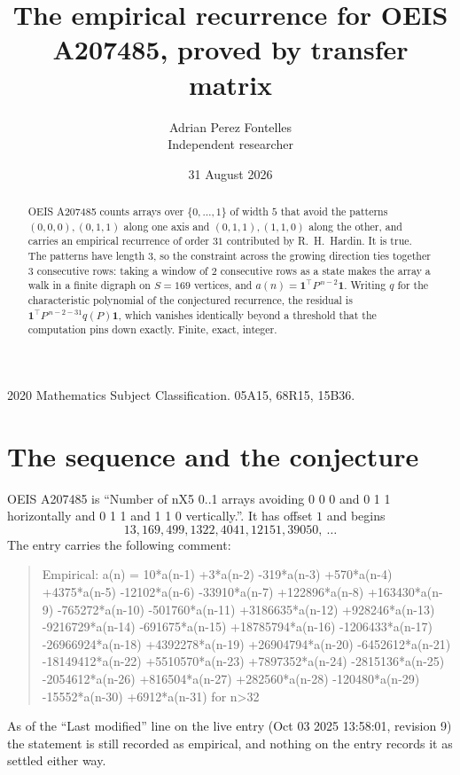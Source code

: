 \documentclass[11pt,a4paper]{article}
\title{The empirical recurrence for OEIS A207485, proved by transfer matrix}
\author{Adrian Perez Fontelles\\ \small Independent researcher}
\date{31 August 2026}
\theoremstyle{plain}
\theoremstyle{definition}
\begin{document}
\maketitle

\begin{abstract}
OEIS A207485 counts arrays over $\{0,\dots,1\}$ of width $5$ that avoid the patterns
$(0,0,0), (0,1,1)$ along one axis and $(0,1,1), (1,1,0)$ along the other, and carries an empirical recurrence of
order $31$ contributed by R.~H.~Hardin. It is true. The patterns have length $3$, so
the constraint across the growing direction ties together $3$ consecutive rows: taking a
window of $2$ consecutive rows as a state makes the array a walk in a finite digraph
on $S=169$ vertices, and $a(n)=\mathbf{1}^{\!\top}P^{\,n-2}\mathbf{1}$. Writing $q$
for the characteristic polynomial of the conjectured recurrence, the residual is
$\mathbf{1}^{\!\top}P^{\,n-2-31}q(P)\mathbf{1}$, which vanishes identically
beyond a threshold that the computation pins down exactly. Finite, exact, integer.
\end{abstract}

\noindent\small 2020 Mathematics Subject Classification. 05A15, 68R15, 15B36.\normalsize

\section{The sequence and the conjecture}

OEIS A207485 is ``Number of nX5 0..1 arrays avoiding 0 0 0 and 0 1 1 horizontally and 0 1 1 and 1 1 0 vertically.''. It has offset
$1$ and begins
\[
13, 169, 499, 1322, 4041, 12151, 39050,\ \dots
\]
The entry carries the following comment:
\begin{quote}\small
Empirical: a(n) = 10*a(n-1) +3*a(n-2) -319*a(n-3) +570*a(n-4) +4375*a(n-5) -12102*a(n-6) -33910*a(n-7) +122896*a(n-8) +163430*a(n-9) -765272*a(n-10) -501760*a(n-11) +3186635*a(n-12) +928246*a(n-13) -9216729*a(n-14) -691675*a(n-15) +18785794*a(n-16) -1206433*a(n-17) -26966924*a(n-18) +4392278*a(n-19) +26904794*a(n-20) -6452612*a(n-21) -18149412*a(n-22) +5510570*a(n-23) +7897352*a(n-24) -2815136*a(n-25) -2054612*a(n-26) +816504*a(n-27) +282560*a(n-28) -120480*a(n-29) -15552*a(n-30) +6912*a(n-31) for n>32
\end{quote}
As of the ``Last modified'' line on the live entry (Oct 03 2025 13:58:01, revision
9) the statement is still recorded as empirical, and nothing on the entry
records it as settled either way.
\end{document}
